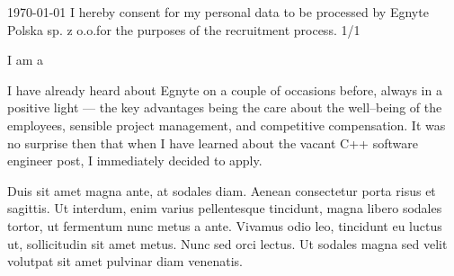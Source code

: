 \documentclass[11pt, a4paper]{awesome-cv}
\begin{document}
\makecvheader[R]

\makecvfooter
  {\today}
  {I hereby consent for my personal data to be processed by Egnyte Polska sp. z o.o.{\break}for the purposes of the recruitment process.}
  {1/1}

\makelettertitle

\begin{cvletter}


I am a 

I have already heard about Egnyte on a couple of occasions before, always in a positive light --- the key advantages being the care about the well--being of the employees, sensible project management, and competitive compensation. It was no surprise then that when I have learned about the vacant C++ software engineer post, I immediately decided to apply.

Duis sit amet magna ante, at sodales diam. Aenean consectetur porta risus et sagittis. Ut interdum, enim varius pellentesque tincidunt, magna libero sodales tortor, ut fermentum nunc metus a ante. Vivamus odio leo, tincidunt eu luctus ut, sollicitudin sit amet metus. Nunc sed orci lectus. Ut sodales magna sed velit volutpat sit amet pulvinar diam venenatis.

\end{cvletter}


\makeletterclosing

\end{document}
